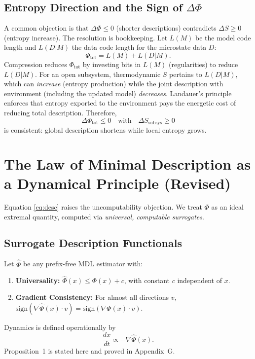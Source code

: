 \documentclass[aps,preprint,onecolumn,longbibliography,nofootinbib]{revtex4-2}
\numberwithin{equation}{section}
\begin{document}
\subsection{Entropy Direction and the Sign of $\Delta\Phi$}\label{sec:sign}
A common objection is that $\Delta\Phi\le 0$ (shorter descriptions) contradicts $\Delta S\ge 0$ (entropy increase). The resolution is bookkeeping. Let $L(M)$ be the model code length and $L(D|M)$ the data code length for the microstate data $D$:
\begin{equation}
\Phi_{\text{tot}} = L(M) + L(D|M). \label{eq:mdl-split}
\end{equation}
Compression reduces $\Phi_{\text{tot}}$ by investing bits in $L(M)$ (regularities) to reduce $L(D|M)$. For an open subsystem, thermodynamic $S$ pertains to $L(D|M)$, which can \emph{increase} (entropy production) while the joint description with environment (including the updated model) \emph{decreases}. Landauer’s principle enforces that entropy exported to the environment pays the energetic cost of reducing total description. Therefore,
\begin{equation}
\Delta\Phi_{\text{tot}}\le 0 \quad \text{with} \quad \Delta S_{\text{subsys}}\ge 0
\end{equation}
is consistent: global description shortens while local entropy grows.

\section{The Law of Minimal Description as a Dynamical Principle (Revised)}\label{sec:dyn}
Equation \eqref{eq:desc} raises the uncomputability objection. We treat $\Phi$ as an ideal extremal quantity, computed via \emph{universal, computable surrogates}.

\subsection{Surrogate Description Functionals}
Let $\widehat{\Phi}$ be any prefix-free MDL estimator with:
\begin{enumerate}
\item \textbf{Universality:} $\widehat{\Phi}(x) \le \Phi(x)+c$, with constant $c$ independent of $x$.
\item \textbf{Gradient Consistency:} For almost all directions $v$, $\mathrm{sign}(\nabla\widehat{\Phi}(x)\!\cdot\! v)=\mathrm{sign}(\nabla\Phi(x)\!\cdot\! v)$.
\end{enumerate}
Dynamics is defined operationally by
\begin{equation}
\frac{dx}{dt} \propto -\nabla \widehat{\Phi}(x). \label{eq:dynamics}
\end{equation}
Proposition~1 is stated here and proved in Appendix~G.
\end{document}

